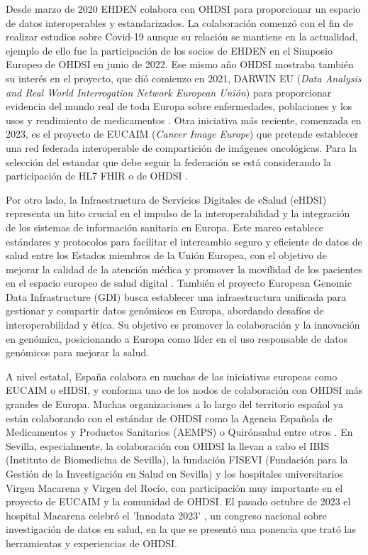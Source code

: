 Desde marzo de 2020 EHDEN colabora con OHDSI para proporcionar un espacio de datos interoperables y estandarizados. La colaboración comenzó con el fin de realizar estudios sobre Covid-19 aunque su relación se mantiene en la actualidad, ejemplo de ello fue la participación de los socios de EHDEN en el Simposio Europeo de OHDSI en junio de 2022. Ese mismo año OHDSI mostraba también su interés en el proyecto, que dió comienzo en 2021, DARWIN EU (\textit{Data Analysis and Real World Interrogation Network European Unión}) \cite{OHDSI2023Darwin} para proporcionar evidencia del mundo real de toda Europa sobre enfermedades, poblaciones y los usos y rendimiento de medicamentos \cite{Darwin2023website}. Otra iniciativa más reciente, comenzada en 2023, es el proyecto de EUCAIM (\textit{Cancer Image Europe}) que pretende establecer una red federada interoperable de compartición de imágenes oncológicas. Para la selección del estandar que debe seguir la federación se está considerando la participación de HL7 FHIR o de OHDSI \cite{Kalokyri2023Early}.

Por otro lado, la Infraestructura de Servicios Digitales de eSalud (eHDSI) \cite{DHE2023eHDSI} representa un hito crucial en el impulso de la interoperabilidad y la integración de los sistemas de información sanitaria en Europa. Este marco establece estándares y protocolos para facilitar el intercambio seguro y eficiente de datos de salud entre los Estados miembros de la Unión Europea, con el objetivo de mejorar la calidad de la atención médica y promover la movilidad de los pacientes en el espacio europeo de salud digital \cite{EU2023Servicios}. También el proyecto European Genomic Data Infrastructure (GDI) \cite{GDI2022GDI} busca establecer una infraestructura unificada para gestionar y compartir datos genómicos en Europa, abordando desafíos de interoperabilidad y ética. Su objetivo es promover la colaboración y la innovación en genómica, posicionando a Europa como líder en el uso responsable de datos genómicos para mejorar la salud.

A nivel estatal, España colabora en muchas de las iniciativas europeas como EUCAIM o eHDSI, y conforma uno de los nodos de colaboración con OHDSI más grandes de Europa. Muchas organizaciones a lo largo del territorio español ya están colaborando con el estándar de OHDSI como la Agencia Española de Medicamentos y Productos Sanitarios (AEMPS) o Quirónsalud entre otros \cite{ohdsiSpain}. En Sevilla, especialmente, la colaboración con OHDSI la llevan a cabo el IBIS (Instituto de Biomedicina de Sevilla), la fundación FISEVI (Fundación para la Gestión de la Investigación en Salud en Sevilla) y los hospitales universitarios Virgen Macarena y Virgen del Rocío, con participación muy importante en el proyecto de EUCAIM y la comunidad de OHDSI. El pasado octubre de 2023 el hospital Macarena celebró el 'Innodata 2023' \cite{HUVM2023INNODATA}, un congreso nacional sobre investigación de datos en salud, en la que se presentó una ponencia que trató las herramientas y experiencias de OHDSI. 

